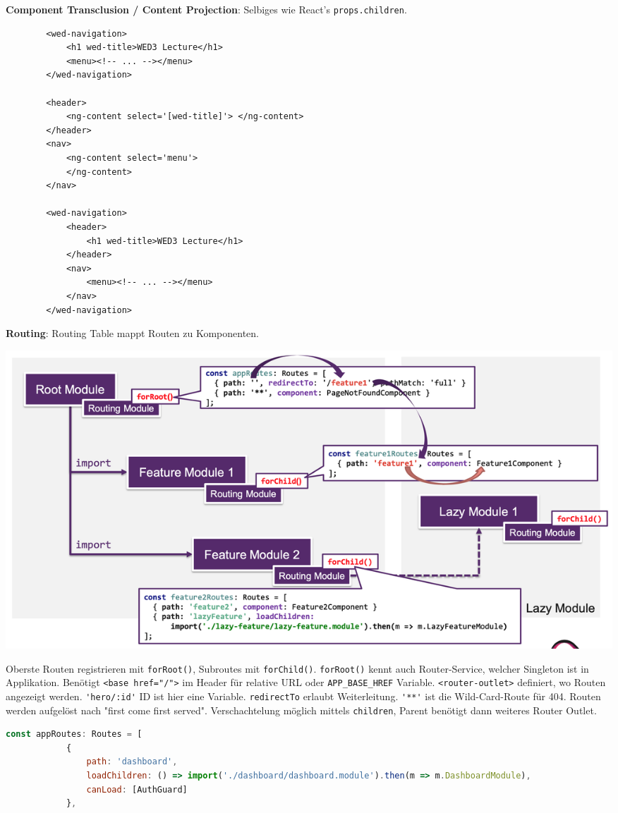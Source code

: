 \documentclass[10pt,landscape]{article}
\begin{document}
\begin{multicols}{2}
        \textbf{Component Transclusion / Content Projection}: Selbiges wie React's \lstinline{props.children}.

        \begin{lstlisting}
        <wed-navigation>
            <h1 wed-title>WED3 Lecture</h1>
            <menu><!-- ... --></menu>
        </wed-navigation>

        <header>
            <ng-content select='[wed-title]'> </ng-content>
        </header>
        <nav>
            <ng-content select='menu'>
            </ng-content>
        </nav>

        <wed-navigation>
            <header>
                <h1 wed-title>WED3 Lecture</h1>
            </header>
            <nav>
                <menu><!-- ... --></menu>
            </nav>
        </wed-navigation>
        \end{lstlisting}

        \textbf{Routing}: Routing Table mappt Routen zu Komponenten.

        \includegraphics[width=\linewidth]{angular_routing}

        Oberste Routen registrieren mit \lstinline{forRoot()}, Subroutes mit \lstinline{forChild()}.
        \lstinline{forRoot()} kennt auch Router-Service, welcher Singleton ist in Applikation.
        Benötigt \lstinline{<base href="/">} im Header für relative URL oder \lstinline{APP_BASE_HREF} Variable.
        \lstinline{<router-outlet>} definiert, wo Routen angezeigt werden.
        \lstinline{'hero/:id'} ID ist hier eine Variable.
        \lstinline{redirectTo} erlaubt Weiterleitung.
        \lstinline{'**'} ist die Wild-Card-Route für 404.
        Routen werden aufgelöst nach "first come first served".
        Verschachtelung möglich mittels \lstinline{children}, Parent benötigt dann weiteres Router Outlet.

        \begin{lstlisting}[language=JavaScript]
        const appRoutes: Routes = [
            {
                path: 'dashboard',
                loadChildren: () => import('./dashboard/dashboard.module').then(m => m.DashboardModule),
                canLoad: [AuthGuard]
            },


\end{lstlisting}
\end{multicols}
\end{document}
